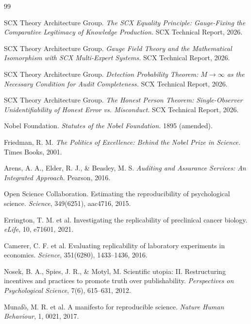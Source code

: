 \documentclass[12pt,a4paper]{article}
\theoremstyle{remark}
\begin{document}
\begin{thebibliography}{99}

SCX Theory Architecture Group.
\textit{The SCX Equality Principle: Gauge-Fixing the Comparative Legitimacy of Knowledge Production.}
SCX Technical Report, 2026.

SCX Theory Architecture Group.
\textit{Gauge Field Theory and the Mathematical Isomorphism with SCX Multi-Expert Systems.}
SCX Technical Report, 2026.

SCX Theory Architecture Group.
\textit{Detection Probability Theorem: $M \to \infty$ as the Necessary Condition for Audit Completeness.}
SCX Technical Report, 2026.

SCX Theory Architecture Group.
\textit{The Honest Person Theorem: Single-Observer Unidentifiability of Honest Error vs. Misconduct.}
SCX Technical Report, 2026.

Nobel Foundation.
\textit{Statutes of the Nobel Foundation.}
1895 (amended).

Friedman, R. M.
\textit{The Politics of Excellence: Behind the Nobel Prize in Science.}
Times Books, 2001.

Arens, A. A., Elder, R. J., \& Beasley, M. S.
\textit{Auditing and Assurance Services: An Integrated Approach.}
Pearson, 2016.

Open Science Collaboration.
Estimating the reproducibility of psychological science.
\textit{Science}, 349(6251), aac4716, 2015.

Errington, T. M. et al.
Investigating the replicability of preclinical cancer biology.
\textit{eLife}, 10, e71601, 2021.

Camerer, C. F. et al.
Evaluating replicability of laboratory experiments in economics.
\textit{Science}, 351(6280), 1433--1436, 2016.

Nosek, B. A., Spies, J. R., \& Motyl, M.
Scientific utopia: II. Restructuring incentives and practices to promote truth over publishability.
\textit{Perspectives on Psychological Science}, 7(6), 615--631, 2012.

Munaf\`{o}, M. R. et al.
A manifesto for reproducible science.
\textit{Nature Human Behaviour}, 1, 0021, 2017.


\end{thebibliography}
\end{document}
